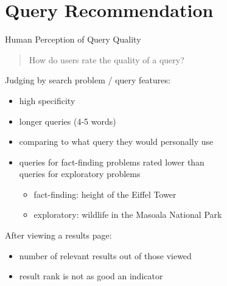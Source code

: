 \section{Query Recommendation}


\begin{frame}{Human Perception of Query Quality}

\begin{quote}
How do users rate the quality of a query?
\end{quote}

\vspace{10pt}

Judging by search problem / query features:
	\begin{itemize}
		\item high specificity
		\item longer queries (4-5 words)
		\item comparing to what query they would personally use
		\item queries for fact-finding problems rated lower than\\ queries for
		exploratory problems %
		\begin{itemize}
			\item fact-finding: height of the Eiffel Tower
			\item exploratory: wildlife in the Masoala National Park
		\end{itemize}
	\end{itemize}
After viewing a results page:
	\begin{itemize}
		\item number of relevant results out of those viewed %
		\item result rank is not as good an indicator
	\end{itemize}

\end{frame}

